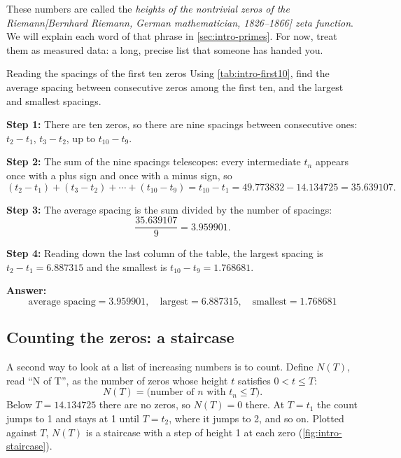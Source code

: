 These numbers are called the \emph{heights of the nontrivial zeros of the Riemann[Bernhard Riemann, German mathematician, 1826--1866] zeta function}. We will explain each word of that phrase in \cref{sec:intro-primes}. For now, treat them as measured data: a long, precise list that someone has handed you.

\begin{sample}{Reading the spacings of the first ten zeros}
Using \cref{tab:intro-first10}, find the average spacing between consecutive zeros among the first ten, and the largest and smallest spacings.

\textbf{Step 1:} There are ten zeros, so there are nine spacings between consecutive ones: $t_2-t_1$, $t_3-t_2$, up to $t_{10}-t_9$.

\textbf{Step 2:} The sum of the nine spacings telescopes: every intermediate $t_n$ appears once with a plus sign and once with a minus sign, so
\[
(t_2 - t_1) + (t_3 - t_2) + \cdots + (t_{10}-t_9) = t_{10} - t_1 = 49.773832 - 14.134725 = 35.639107 .
\]

\textbf{Step 3:} The average spacing is the sum divided by the number of spacings:
\[
\frac{35.639107}{9} = 3.959901 .
\]

\textbf{Step 4:} Reading down the last column of the table, the largest spacing is $t_2 - t_1 = 6.887315$ and the smallest is $t_{10}-t_9 = 1.768681$.

\textbf{Answer:}
\[
\boxed{\text{average spacing} = 3.959901,\quad \text{largest} = 6.887315,\quad \text{smallest} = 1.768681}
\]
\end{sample}

\subsection{Counting the zeros: a staircase}

A second way to look at a list of increasing numbers is to count. Define $N(T)$, read ``N of T'', as the number of zeros whose height $t$ satisfies $0 < t \le T$:
\begin{equation}
N(T) = \text{(number of } n \text{ with } t_n \le T\text{)} .
\label{eq:intro-NT}
\end{equation}
Below $T = 14.134725$ there are no zeros, so $N(T) = 0$ there. At $T = t_1$ the count jumps to 1 and stays at 1 until $T = t_2$, where it jumps to 2, and so on. Plotted against $T$, $N(T)$ is a staircase with a step of height 1 at each zero (\cref{fig:intro-staircase}).

